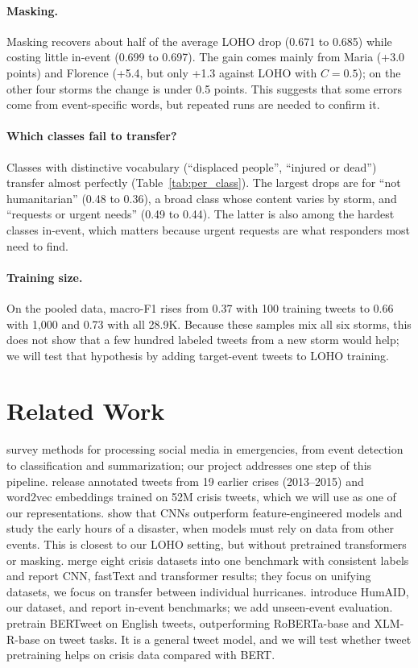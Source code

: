 \documentclass[11pt,a4paper]{article}
\begin{document}
\paragraph{Masking.} Masking recovers about half of the average LOHO drop (0.671 to 0.685) while costing little in-event (0.699 to 0.697). The gain comes mainly from Maria (+3.0 points) and Florence (+5.4, but only +1.3 against LOHO with $C=0.5$); on the other four storms the change is under 0.5 points. This suggests that some errors come from event-specific words, but repeated runs are needed to confirm it.

\paragraph{Which classes fail to transfer?} Classes with distinctive vocabulary (``displaced people'', ``injured or dead'') transfer almost perfectly (Table~\ref{tab:per_class}). The largest drops are for ``not humanitarian'' (0.48 to 0.36), a broad class whose content varies by storm, and ``requests or urgent needs'' (0.49 to 0.44). The latter is also among the hardest classes in-event, which matters because urgent requests are what responders most need to find.

\paragraph{Training size.} On the pooled data, macro-F1 rises from 0.37 with 100 training tweets to 0.66 with 1,000 and 0.73 with all 28.9K. Because these samples mix all six storms, this does not show that a few hundred labeled tweets from a new storm would help; we will test that hypothesis by adding target-event tweets to LOHO training.

\section{Related Work}

\citet{imran2015survey} survey methods for processing social media in emergencies, from event detection to classification and summarization; our project addresses one step of this pipeline.
\citet{imran2016lifeline} release annotated tweets from 19 earlier crises (2013--2015) and word2vec embeddings trained on 52M crisis tweets, which we will use as one of our representations.
\citet{nguyen2016rapid} show that CNNs outperform feature-engineered models and study the early hours of a disaster, when models must rely on data from other events. This is closest to our LOHO setting, but without pretrained transformers or masking.
\citet{alam2021crisisbench} merge eight crisis datasets into one benchmark with consistent labels and report CNN, fastText and transformer results; they focus on unifying datasets, we focus on transfer between individual hurricanes.
\citet{alam2021humaid} introduce HumAID, our dataset, and report in-event benchmarks; we add unseen-event evaluation.
\citet{nguyen2020bertweet} pretrain BERTweet on English tweets, outperforming RoBERTa-base and XLM-R-base on tweet tasks. It is a general tweet model, and we will test whether tweet pretraining helps on crisis data compared with BERT.
\end{document}
